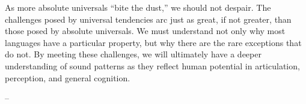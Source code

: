 \newpage
\begin{adjustwidth}{2cm}{}
\vspace*{4\baselineskip}
As more absolute universals ``bite the dust,'' we should not despair.
The challenges posed by universal tendencies arc just as great, if not greater, than those posed by absolute universals.
We must understand not only why most languages have a particular property, but why there are the rare exceptions that do not.
By meeting these challenges, we will ultimately have a deeper understanding of sound patterns as they reflect human potential in articulation, perception, and general cognition.

-- \citet[p. 272]{blevins2009}

\vfill
\end{adjustwidth}
\newpage








